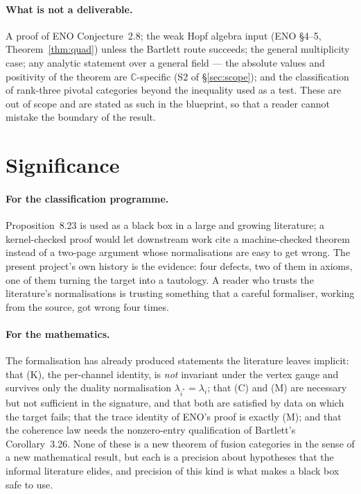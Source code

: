 \documentclass[11pt,a4paper]{article}
\theoremstyle{remark}
\newcommand{\Cx}{\mathbb{C}}
\begin{document}
\paragraph{What is not a deliverable.} A proof of ENO Conjecture~2.8; the weak Hopf algebra input
(ENO \S4--5, Theorem~\ref{thm:quad}) unless the Bartlett route succeeds; the general multiplicity
case; any analytic statement over a general field --- the absolute values and positivity of the
theorem are $\Cx$-specific (S2 of \S\ref{sec:scope}); and the classification of
rank-three pivotal categories beyond the inequality used as a test. These are out of scope and
are stated as such in the blueprint, so that a reader cannot mistake the boundary of the result.

\section{Significance}\label{sec:significance}

\paragraph{For the classification programme.} Proposition~8.23 is used as a black box in a large
and growing literature; a kernel-checked proof would let downstream work cite a machine-checked
theorem instead of a two-page argument whose normalisations are easy to get wrong. The present
project's own history is the evidence: four defects, two of them in axioms, one of them turning
the target into a tautology. A reader who trusts the literature's normalisations is trusting
something that a careful formaliser, working from the source, got wrong four times.

\paragraph{For the mathematics.} The formalisation has already produced statements the
literature leaves implicit: that (K), the per-channel identity, is \emph{not} invariant under the
vertex gauge and survives only the duality normalisation $\lambda_{i^*} = \lambda_i$; that (C)
and (M) are necessary but not sufficient in the signature, and that both are satisfied by data on
which the target fails; that the trace identity of ENO's proof is exactly (M); and that the
coherence law needs the nonzero-entry qualification of Bartlett's Corollary~3.26. None of these
is a new theorem of fusion categories in the sense of a new mathematical result, but each is a
precision about hypotheses that the informal literature elides, and precision of this kind is
what makes a black box safe to use.
\end{document}
